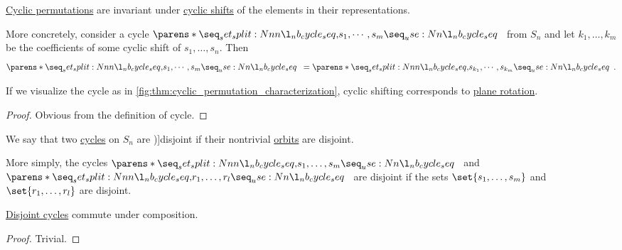 \begin{proposition}\label{thm:cyclic_permutation_cyclic_shift}
  \hyperref[def:cyclic_permutation]{Cyclic permutations} are invariant under \hyperref[def:cyclic_shift]{cyclic shifts} of the elements in their representations.

  More concretely, consider a cycle \( \cycle{ s_1, \cdots, s_m } \) from \( S_n \) and let \( k_1, \ldots, k_m \) be the coefficients of some cyclic shift of \( s_1, \ldots, s_n \). Then
  \begin{equation*}
    \cycle{ s_1, \cdots, s_m } = \cycle{ s_{k_1}, \cdots, s_{k_m} }.
  \end{equation*}
\end{proposition}
\begin{comments}
  \item If we visualize the cycle as in \cref{fig:thm:cyclic_permutation_characterization}, cyclic shifting corresponds to \hyperref[def:rigid_motion/rotation]{plane rotation}.
\end{comments}
\begin{proof}
  Obvious from the definition of cycle.
\end{proof}

\begin{definition}\label{def:disjoint_cycle}
  We say that two \hyperref[def:cyclic_permutation]{cycles} on \( S_n \) are \term[ru=независимые (\cite[sec. 4.3]{Тыртышников2007ЛинейнаяАлгебра})]{disjoint} if their nontrivial \hyperref[def:group_action_orbit]{orbits} are disjoint.
\end{definition}
\begin{comments}
  \item More simply, the cycles \( \cycle{ s_1, \ldots, s_m } \) and \( \cycle{ r_1, \ldots, r_l } \) are disjoint if the sets \( \set{ s_1, \ldots, s_m } \) and \( \set{ r_1, \ldots, r_l } \) are disjoint.
\end{comments}

\begin{proposition}\label{thm:disjoint_cycles_commute}
  \hyperref[def:disjoint_cycle]{Disjoint cycles} commute under composition.
\end{proposition}
\begin{proof}
  Trivial.
\end{proof}

